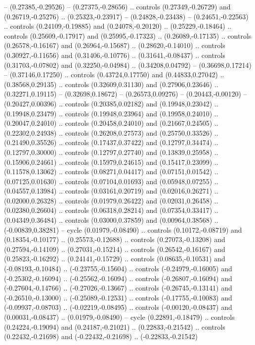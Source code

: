 {{-- (0.27385,-0.29526)
-- (0.27375,-0.28656)
.. controls (0.27349,-0.26729) and (0.26719,-0.25276) .. (0.25323,-0.23917)
-- (0.24828,-0.23438)
-- (0.24651,-0.22563)
.. controls (0.24109,-0.19885) and (0.24078,-0.20120) .. (0.25229,-0.18464)
.. controls (0.25609,-0.17917) and (0.25995,-0.17323) .. (0.26089,-0.17135)
.. controls (0.26578,-0.16167) and (0.26964,-0.15687) .. (0.28620,-0.14010)
.. controls (0.30927,-0.11656) and (0.31406,-0.10776) .. (0.31641,-0.08437)
.. controls (0.31703,-0.07802) and (0.32250,-0.04984) .. (0.34208,0.04792)
-- (0.36698,0.17214)
-- (0.37146,0.17250)
.. controls (0.43724,0.17750) and (0.44833,0.27042) .. (0.38568,0.29135)
.. controls (0.32609,0.31130) and (0.27906,0.23646) .. (0.32271,0.19115)
-- (0.32698,0.18672)
-- (0.26573,0.09276)
-- (0.20443,-0.00120)
-- (0.20427,0.00396)
.. controls (0.20385,0.02182) and (0.19948,0.23042) .. (0.19948,0.23479)
.. controls (0.19948,0.23964) and (0.19958,0.24010) .. (0.20047,0.24010)
.. controls (0.20458,0.24010) and (0.21667,0.24505) .. (0.22302,0.24938)
.. controls (0.26208,0.27573) and (0.25750,0.33526) .. (0.21490,0.35526)
.. controls (0.17437,0.37422) and (0.12797,0.34474) .. (0.12797,0.30000)
.. controls (0.12797,0.27740) and (0.13839,0.25958) .. (0.15906,0.24661)
.. controls (0.15979,0.24615) and (0.15417,0.23099) .. (0.11578,0.13062)
.. controls (0.08271,0.04417) and (0.07151,0.01542) .. (0.07125,0.01630)
.. controls (0.07104,0.01693) and (0.05948,0.07255) .. (0.04557,0.13984)
.. controls (0.03161,0.20719) and (0.02016,0.26271) .. (0.02000,0.26328)
.. controls (0.01979,0.26422) and (0.02031,0.26458) .. (0.02380,0.26604)
.. controls (0.06318,0.28214) and (0.07354,0.33417) .. (0.04349,0.36484)
.. controls (0.03000,0.37859) and (0.00964,0.38568) .. (-0.00839,0.38281)
-- cycle
(0.01979,-0.08490)
.. controls (0.10172,-0.08719) and (0.18354,-0.10177) .. (0.25573,-0.12688)
.. controls (0.27073,-0.13208) and (0.27594,-0.14109) .. (0.27031,-0.15214)
.. controls (0.26542,-0.16167) and (0.25823,-0.16292) .. (0.24141,-0.15729)
.. controls (0.08635,-0.10531) and (-0.08193,-0.10484) .. (-0.23755,-0.15604)
.. controls (-0.24979,-0.16005) and (-0.25302,-0.16094) .. (-0.25562,-0.16094)
.. controls (-0.26807,-0.16094) and (-0.27604,-0.14766) .. (-0.27026,-0.13667)
.. controls (-0.26745,-0.13141) and (-0.26510,-0.13000) .. (-0.25089,-0.12531)
.. controls (-0.17755,-0.10083) and (-0.09937,-0.08703) .. (-0.02219,-0.08495)
.. controls (-0.00120,-0.08437) and (0.00031,-0.08437) .. (0.01979,-0.08490)
-- cycle
(0.22891,-0.18479)
.. controls (0.24224,-0.19094) and (0.24187,-0.21021) .. (0.22833,-0.21542)
.. controls (0.22432,-0.21698) and (-0.22432,-0.21698) .. (-0.22833,-0.21542)
}}
